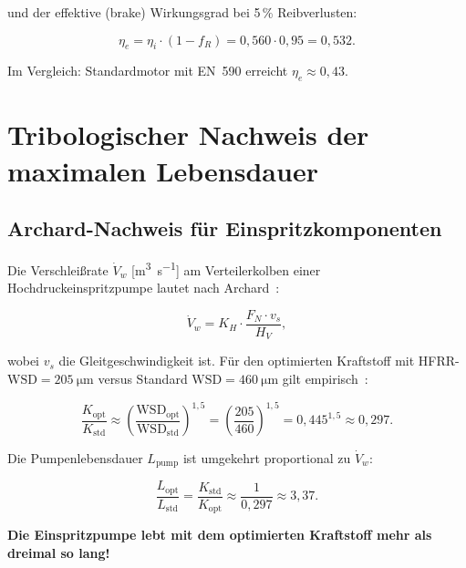 ﻿\documentclass[12pt,a4paper]{article}
\newcommand{\WSD}{\ensuremath{\mathrm{WSD}}}
\begin{document}
und der effektive (brake) Wirkungsgrad bei 5\,\% Reibverlusten:

\begin{equation}
  \eta_e = \eta_i \cdot (1 - f_R) = 0{,}560 \cdot 0{,}95 = 0{,}532.
\end{equation}

Im Vergleich: Standardmotor mit EN~590 erreicht $\eta_e \approx 0{,}43$.

\section{Tribologischer Nachweis der maximalen Lebensdauer}
\label{sec:tribologie}

\subsection{Archard-Nachweis für Einspritzkomponenten}
\label{sec:tribologie_archard}

Die Verschlei\ss{}rate $\dot{V}_w$ [\si{\m\cubed\per\s}] am Verteilerkolben
einer Hochdruckeinspritzpumpe lautet nach Archard~\cite{archard1953}:

\begin{equation}
  \dot{V}_w = K_H \cdot \frac{F_N \cdot v_s}{H_V},
  \label{eq:vdot_archard}
\end{equation}

wobei $v_s$ die Gleitgeschwindigkeit ist. Für den optimierten Kraftstoff
mit HFRR-$\WSD = \SI{205}{\micro\m}$ versus Standard $\WSD = \SI{460}{\micro\m}$
gilt empirisch~\cite{kerschbaumer2002}:

\begin{equation}
  \frac{K_{\mathrm{opt}}}{K_{\mathrm{std}}} \approx
  \left(\frac{\WSD_{\mathrm{opt}}}{\WSD_{\mathrm{std}}}\right)^{1{,}5}
  = \left(\frac{205}{460}\right)^{1{,}5} = 0{,}445^{1{,}5} \approx 0{,}297.
\end{equation}

Die Pumpenlebensdauer $L_{\mathrm{pump}}$ ist umgekehrt proportional zu $\dot{V}_w$:

\begin{equation}
  \frac{L_{\mathrm{opt}}}{L_{\mathrm{std}}} = \frac{K_{\mathrm{std}}}{K_{\mathrm{opt}}}
  \approx \frac{1}{0{,}297} \approx 3{,}37.
\end{equation}

\textbf{Die Einspritzpumpe lebt mit dem optimierten Kraftstoff mehr als
dreimal so lang!}
\end{document}
